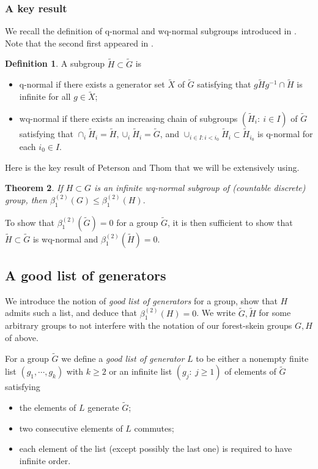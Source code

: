 \documentclass[a4paper, 12pt]{amsart}
\numberwithin{equation}{section}
\newtheorem{theorem}{Theorem}[section]
\theoremstyle{definition}
\newtheorem{definition}[theorem]{Definition}
\newcommand{\betti}{\beta^{(2)}_1}
\newcommand{\ti}{\tilde}
\begin{document}
\subsubsection{A key result}
We recall the definition of q-normal and wq-normal subgroups introduced in \cite[Section 5.1]{Peterson-Thom11}.
Note that the second first appeared in \cite{Popa06}.

\begin{definition}
A subgroup $\ti H\subset \ti G$ is 
\begin{itemize}
\item q-normal if there exists a generator set $\ti X$ of $\ti G$ satisfying that $g\ti Hg^{-1} \cap \ti H$ is infinite for all $g\in \ti X$;
\item wq-normal if there exists an increasing chain of subgroups $(\ti H_i:\ i\in I)$ of $\ti G$ satisfying that $\cap_i \ti H_i=\ti H, \cup_i \ti H_i=\ti G$, and 
$\cup_{i\in I: i<i_0} \ti H_i \subset \ti H_{i_0}$ is q-normal for each $i_0\in I.$
\end{itemize}
\end{definition}

Here is the key result of Peterson and Thom that we will be extensively using.
\begin{theorem}\label{theo:PT11}
If $H\subset G$ is an infinite wq-normal subgroup of (countable discrete) group, then $\beta^{(2)}_1(G)\leq \beta^{(2)}_1(H).$
\end{theorem}

To show that $\betti(\ti G)=0$ for a group $\ti G$, it is then sufficient to show that $\ti H\subset \ti G$ is wq-normal and $\betti(\ti H)=0$.

\subsection{A good list of generators}
We introduce the notion of {\it good list of generators} for a group, show that $H$ admits such a list, and deduce that $\betti(H)=0$.
We write $\ti G,\ti H$ for some arbitrary groups to not interfere with the notation of our forest-skein groups $G,H$ of above.

For a group $\ti G$ we define a {\it good list of generator} $L$ to be either a nonempty finite list $(g_1,\cdots,g_k)$ with $k\geq 2$ or an infinite list $(g_j:\ j\geq 1)$ of elements of $\ti G$ satisfying
\begin{itemize}
\item the elements of $L$ generate $\ti G$;
\item two consecutive elements of $L$ commutes;
\item each element of the list (except possibly the last one) is required to have infinite order.
\end{itemize}
\end{document}
